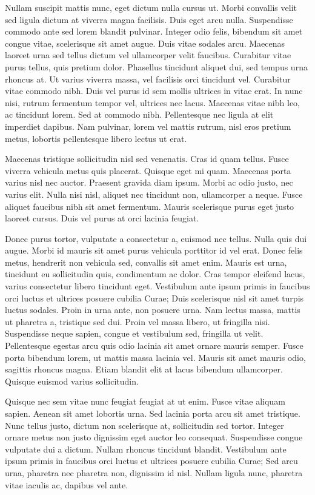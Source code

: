 Nullam suscipit mattis nunc, eget dictum nulla cursus ut.
Morbi convallis velit sed ligula dictum at viverra magna facilisis.
Duis eget arcu nulla.
Suspendisse commodo ante sed lorem blandit pulvinar.
Integer odio felis, bibendum sit amet congue vitae, scelerisque sit amet augue.
Duis vitae sodales arcu.
Maecenas laoreet urna sed tellus dictum vel ullamcorper velit faucibus.
Curabitur vitae purus tellus, quis pretium dolor.
Phasellus tincidunt aliquet dui, sed tempus urna rhoncus at.
Ut varius viverra massa, vel facilisis orci tincidunt vel.
Curabitur vitae commodo nibh.
Duis vel purus id sem mollis ultrices in vitae erat.
In nunc nisi, rutrum fermentum tempor vel, ultrices nec lacus.
Maecenas vitae nibh leo, ac tincidunt lorem.
Sed at commodo nibh.
Pellentesque nec ligula at elit imperdiet dapibus.
Nam pulvinar, lorem vel mattis rutrum, nisl eros pretium metus, lobortis pellentesque libero lectus ut erat.

Maecenas tristique sollicitudin nisl sed venenatis.
Cras id quam tellus.
Fusce viverra vehicula metus quis placerat.
Quisque eget mi quam.
Maecenas porta varius nisl nec auctor.
Praesent gravida diam ipsum.
Morbi ac odio justo, nec varius elit.
Nulla nisi nisl, aliquet nec tincidunt non, ullamcorper a neque.
Fusce aliquet faucibus nibh sit amet fermentum.
Mauris scelerisque purus eget justo laoreet cursus.
Duis vel purus at orci lacinia feugiat.

Donec purus tortor, vulputate a consectetur a, euismod nec tellus.
Nulla quis dui augue.
Morbi id mauris sit amet purus vehicula porttitor id vel erat.
Donec felis metus, hendrerit non vehicula sed, convallis sit amet enim.
Mauris est urna, tincidunt eu sollicitudin quis, condimentum ac dolor.
Cras tempor eleifend lacus, varius consectetur libero tincidunt eget.
Vestibulum ante ipsum primis in faucibus orci luctus et ultrices posuere cubilia Curae; Duis scelerisque nisl sit amet turpis luctus sodales.
Proin in urna ante, non posuere urna.
Nam lectus massa, mattis ut pharetra a, tristique sed dui.
Proin vel massa libero, ut fringilla nisi.
Suspendisse neque sapien, congue et vestibulum sed, fringilla ut velit.
Pellentesque egestas arcu quis odio lacinia sit amet ornare mauris semper.
Fusce porta bibendum lorem, ut mattis massa lacinia vel.
Mauris sit amet mauris odio, sagittis rhoncus magna.
Etiam blandit elit at lacus bibendum ullamcorper.
Quisque euismod varius sollicitudin.

Quisque nec sem vitae nunc feugiat feugiat at ut enim.
Fusce vitae aliquam sapien.
Aenean sit amet lobortis urna.
Sed lacinia porta arcu sit amet tristique.
Nunc tellus justo, dictum non scelerisque at, sollicitudin sed tortor.
Integer ornare metus non justo dignissim eget auctor leo consequat.
Suspendisse congue vulputate dui a dictum.
Nullam rhoncus tincidunt blandit.
Vestibulum ante ipsum primis in faucibus orci luctus et ultrices posuere cubilia Curae; Sed arcu urna, pharetra nec pharetra non, dignissim id nisl.
Nullam ligula nunc, pharetra vitae iaculis ac, dapibus vel ante.

